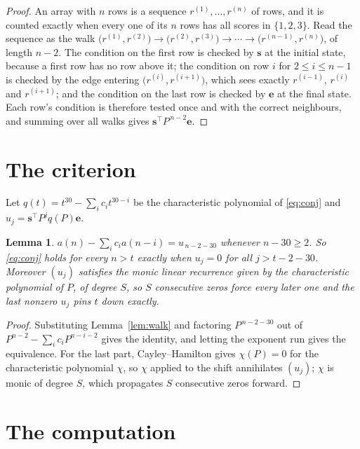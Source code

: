 \documentclass[11pt,a4paper]{article}
\theoremstyle{plain}
\newtheorem{lemma}[theorem]{Lemma}
\theoremstyle{definition}
\begin{document}
\begin{proof}
An array with $n$ rows is a sequence $r^{(1)},\dots,r^{(n)}$ of rows, and it is counted
exactly when every one of its $n$ rows has all scores in $\{1,2,3\}$. Read the sequence as the
walk $\bigl(r^{(1)},r^{(2)}\bigr)\to\bigl(r^{(2)},r^{(3)}\bigr)\to\cdots\to
\bigl(r^{(n-1)},r^{(n)}\bigr)$, of length $n-2$. The condition on the first row is
checked by $\mathbf{s}$ at the initial state, because a first row has no row above it; the
condition on row $i$ for $2\le i\le n-1$ is checked by the edge entering
$\bigl(r^{(i)},r^{(i+1)}\bigr)$, which sees exactly $r^{(i-1)}$, $r^{(i)}$ and
$r^{(i+1)}$; and the condition on the last row is checked by $\mathbf{e}$ at the final
state. Each row's condition is therefore tested once and with the correct neighbours, and
summing over all walks gives $\mathbf{s}^{\!\top}P^{\,n-2}\mathbf{e}$.
\end{proof}

\section{The criterion}

Let $q(t)=t^{30}-\sum_i c_i t^{30-i}$ be the characteristic polynomial of
\eqref{eq:conj} and $u_j=\mathbf{s}^{\!\top}P^{j}q(P)\mathbf{e}$.

\begin{lemma}\label{lem:crit}
$a(n)-\sum_i c_i a(n-i)=u_{\,n-2-30}$ whenever $n-30\ge2$. So \eqref{eq:conj}
holds for every $n>t$ exactly when $u_j=0$ for all $j>t-2-30$. Moreover $(u_j)$
satisfies the monic linear recurrence given by the characteristic polynomial of $P$, of
degree $S$, so $S$ consecutive zeros force every later one and the last nonzero $u_j$ pins
$t$ down exactly.
\end{lemma}

\begin{proof}
Substituting Lemma~\ref{lem:walk} and factoring $P^{\,n-2-30}$ out of
$P^{n-2}-\sum_i c_i P^{n-i-2}$ gives the identity, and letting the exponent run gives the
equivalence. For the last part, Cayley--Hamilton gives $\chi(P)=0$ for the characteristic
polynomial $\chi$, so $\chi$ applied to the shift annihilates $(u_j)$; $\chi$ is monic of
degree $S$, which propagates $S$ consecutive zeros forward.
\end{proof}

\section{The computation}
\end{document}
